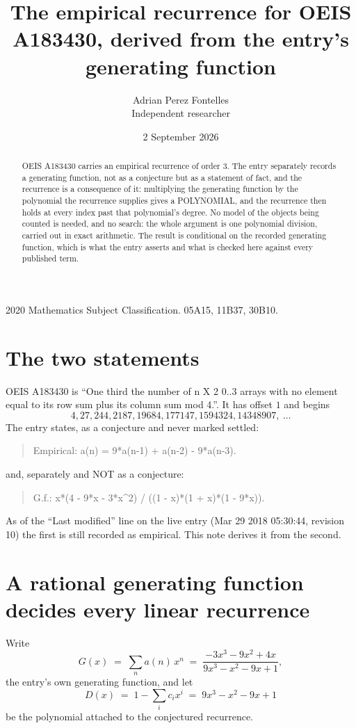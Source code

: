 \documentclass[11pt,a4paper]{article}
\title{The empirical recurrence for OEIS A183430, derived from the entry's generating function}
\author{Adrian Perez Fontelles\\ \small Independent researcher}
\date{2 September 2026}
\theoremstyle{plain}
\theoremstyle{definition}
\begin{document}
\maketitle

\begin{abstract}
OEIS A183430 carries an empirical recurrence of order $3$. The entry separately records a
generating function, not as a conjecture but as a statement of fact, and the recurrence is a
consequence of it: multiplying the generating function by the polynomial the recurrence
supplies gives a POLYNOMIAL, and the recurrence then holds at every index past that
polynomial's degree. No model of the objects being counted is needed, and no search: the
whole argument is one polynomial division, carried out in exact arithmetic. The result is
conditional on the recorded generating function, which is what the entry asserts and what is
checked here against every published term.
\end{abstract}

\noindent\small 2020 Mathematics Subject Classification. 05A15, 11B37, 30B10.\normalsize

\section{The two statements}

OEIS A183430 is ``One third the number of n X 2 0..3 arrays with no element equal to its row sum plus its column sum mod 4.''. It has offset $1$ and begins
\[
4, 27, 244, 2187, 19684, 177147, 1594324, 14348907,\ \dots
\]
The entry states, as a conjecture and never marked settled:
\begin{quote}
Empirical: a(n) = 9*a(n-1) + a(n-2) - 9*a(n-3).
\end{quote}
and, separately and NOT as a conjecture:
\begin{quote}
G.f.: x*(4 - 9*x - 3*x\^{}2) / ((1 - x)*(1 + x)*(1 - 9*x)).
\end{quote}
As of the ``Last modified'' line on the live entry (Mar 29 2018 05:30:44, revision 10) the first is still
recorded as empirical. This note derives it from the second.

\section{A rational generating function decides every linear recurrence}

Write
\[
G(x)\;=\;\sum_{n}a(n)\,x^{n}\;=\;\frac{- 3 x^{3} - 9 x^{2} + 4 x}{9 x^{3} - x^{2} - 9 x + 1},
\]
the entry's own generating function, and let
\[
D(x)\;=\;1-\sum_i c_i x^{i}\;=\;9 x^{3} - x^{2} - 9 x + 1
\]
be the polynomial attached to the conjectured recurrence.
\end{document}
